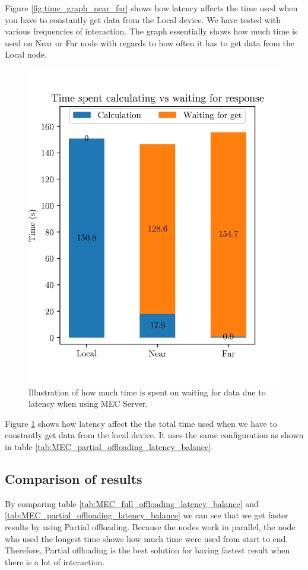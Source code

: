 Figure \ref{fig:time_graph_near_far} shows how latency affects the time used when you have to constantly get data from the Local device. We have tested with various frequencies of interaction. The graph essentially shows how much time is used on Near or Far node with regards to how often it has to get data from the Local node. 
\begin{figure}[t]
    \centering
    \includegraphics[scale=1]{chapters/evaluation/figures/bar_local_near_far_compare.png}
    \caption{Illustration of how much time is spent on waiting for data due to latency when using MEC Server.}
    \label{fig:bar_local_near_far}
\end{figure}

Figure \ref{fig:bar_local_near_far} shows how latency affect the the total time used when we have to constantly get data from the local device. It uses the same configuration as shown in table \ref{tab:MEC_partial_offloading_latency_balance}.




\subsection{Comparison of results} \label{subsection:MEC_comparison}%
By comparing table \ref{tab:MEC_full_offloading_latency_balance} and \ref{tab:MEC_partial_offloading_latency_balance} we can see that we get faster results by using Partial offloading. Because the nodes work in parallel, the node who used the longest time shows how much time were used from start to end. Therefore, Partial offloading is the best solution for having fastest result when there is a lot of interaction.


